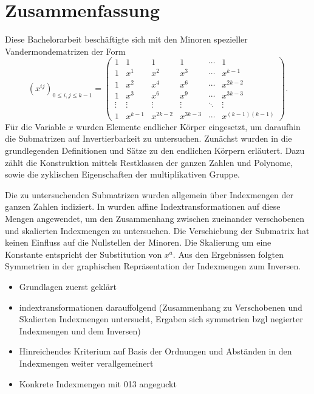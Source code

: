 \section{Zusammenfassung}

Diese Bachelorarbeit beschäftigte sich mit den Minoren spezieller Vandermondematrizen der Form 
\begin{equation*}
    \left( x^{ij} \right)_{0\leq i,j \leq k-1} = \begin{pmatrix}
        1     & 1    & 1    & 1    &\cdots& 1 \\
        1     & x^1  & x^2  & x^3  &\cdots& x^{k-1} \\
        1     & x^2  & x^4  & x^6  &\cdots& x^{2k-2} \\
        1     & x^3  & x^6  & x^9  &\cdots& x^{3k-3} \\
        \vdots&\vdots&\vdots&\vdots&\ddots&\vdots \\
        1     &x^{k-1}&x^{2k-2}&x^{3k-3}&\cdots&x^{(k-1)(k-1)}
    \end{pmatrix}.
\end{equation*}
Für die Variable $x$ wurden Elemente endlicher Körper eingesetzt, um daraufhin die Submatrizen auf Invertierbarkeit zu untersuchen. Zunächst wurden in  die grundlegenden Definitionen und Sätze zu den endlichen Körpern erläutert. Dazu zählt die Konstruktion mittels Restklassen der ganzen Zahlen und Polynome, sowie die zyklischen Eigenschaften der multiplikativen Gruppe.

Die zu untersuchenden Submatrizen wurden allgemein über Indexmengen der ganzen Zahlen indiziert. In  wurden affine Indextransformationen auf diese Mengen angewendet, um den Zusammenhang zwischen zueinander verschobenen und skalierten Indexmengen zu untersuchen. Die Verschiebung der Submatrix hat keinen Einfluss auf die Nullstellen der Minoren. Die Skalierung um eine Konstante entspricht der Substitution von $x^a$. Aus den Ergebnissen folgten Symmetrien in der graphischen Repräsentation der Indexmengen zum Inversen.



\begin{itemize}
    \item Grundlagen zuerst geklärt
    \item indextransformationen darauffolgend (Zusammenhang zu Verschobenen und Skalierten Indexmengen untersucht, Ergaben sich symmetrien bzgl negierter Indexmengen und dem Inversen)
    \item Hinreichendes Kriterium auf Basis der Ordnungen und Abständen in den Indexmengen weiter verallgemeinert
    \item Konkrete Indexmengen mit 013 angeguckt
\end{itemize}